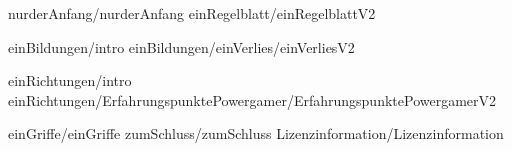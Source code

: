 
 {nurderAnfang/nurderAnfang}
 {einRegelblatt/einRegelblattV2}

 {einBildungen/intro}
 {einBildungen/einVerlies/einVerliesV2}

 {einRichtungen/intro}
 {einRichtungen/ErfahrungspunktePowergamer/ErfahrungspunktePowergamerV2}

 {einGriffe/einGriffe}
 {zumSchluss/zumSchluss}
 {Lizenzinformation/Lizenzinformation}


